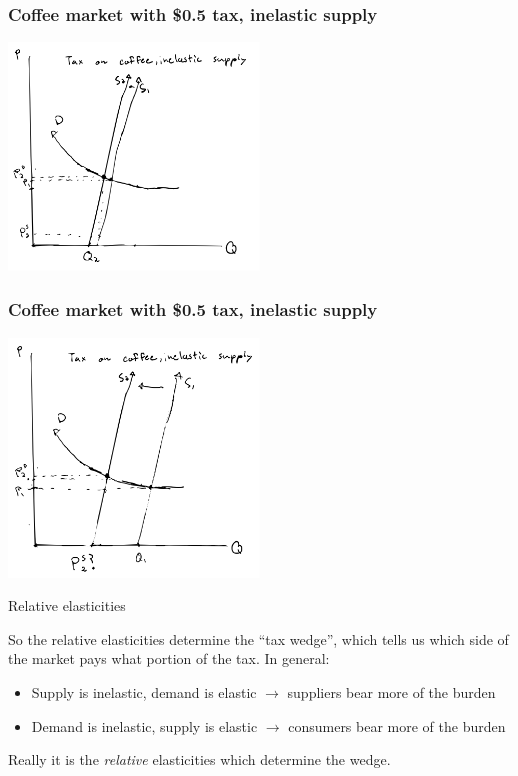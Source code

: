 \documentclass[aspectratio=169]{beamer}
\begin{document}
\begin{frame}
    \frametitle{Coffee market with \$0.5 tax, inelastic supply}
    \centering
    \includegraphics[width = 0.5\textwidth,keepaspectratio]{coffee_tax_is1.png}
\end{frame}

\begin{frame}
    \frametitle{Coffee market with \$0.5 tax, inelastic supply}
    \centering
    \includegraphics[width = 0.5\textwidth,keepaspectratio]{coffee_tax_is2.png}
\end{frame}

\begin{frame}{Relative elasticities}

    So the relative elasticities determine the ``tax wedge'', which tells us which side of the market pays what portion of the tax. In general:
    \begin{itemize}
        \item Supply is inelastic, demand is elastic $\to$ suppliers bear more of the burden
        \item Demand is inelastic, supply is elastic $\to$ consumers bear more of the burden
    \end{itemize}

    \vspace{5mm}

    Really it is the \textit{relative} elasticities which determine the wedge.
\end{frame}
\end{document}
